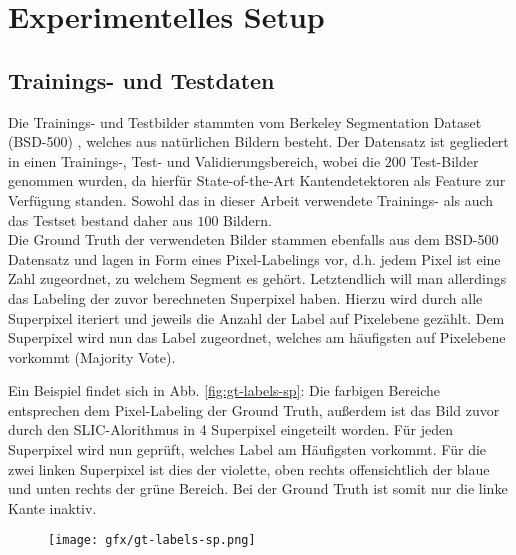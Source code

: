 \chapter{Experimentelles Setup}\label{ch:mathtest} %

\section{Trainings- und Testdaten}


Die Trainings- und Testbilder stammten vom Berkeley Segmentation Dataset (BSD-500) \cite{BSD}, welches aus natürlichen Bildern besteht. Der Datensatz ist gegliedert in einen Trainings-, Test- und Validierungsbereich, wobei die $200$ Test-Bilder genommen wurden, da hierfür State-of-the-Art Kantendetektoren als Feature zur Verfügung standen. Sowohl das in dieser Arbeit verwendete Trainings- als auch das Testset bestand daher aus $100$ Bildern. \\

Die Ground Truth der verwendeten Bilder stammen ebenfalls aus dem BSD-500 Datensatz und lagen in Form eines Pixel-Labelings vor, d.h. jedem Pixel ist eine Zahl zugeordnet, zu welchem Segment es gehört. Letztendlich will man allerdings das Labeling der zuvor berechneten Superpixel haben. Hierzu wird durch alle Superpixel iteriert und jeweils die Anzahl der Label auf Pixelebene gezählt. Dem Superpixel wird nun das Label zugeordnet, welches am häufigsten auf Pixelebene vorkommt (Majority Vote). 

Ein Beispiel findet sich in Abb. \ref{fig:gt-labels-sp}: Die farbigen Bereiche entsprechen dem Pixel-Labeling der Ground Truth, außerdem ist das Bild zuvor durch den SLIC-Alorithmus in 4 Superpixel eingeteilt worden. Für jeden Superpixel wird nun geprüft, welches Label am Häufigsten vorkommt. Für die zwei linken Superpixel ist dies der violette, oben rechts offensichtlich der blaue und unten rechts der grüne Bereich. Bei der Ground Truth ist somit nur die linke Kante inaktiv. 

\vspace{1cm}

\begin{figure}[H]
	\centering
	\texttt{[image: gfx/gt-labels-sp.png]}
\end{figure}
\label{fig:gt-labels-sp}
\vspace{1cm}

